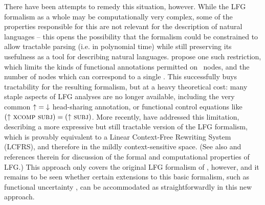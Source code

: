 \documentclass[output=paper,hidelinks]{langscibook}
\begin{document}
There have been attempts to remedy this situation, however. While the LFG
formalism as a whole may be computationally very complex, some of the properties
responsible for this are not relevant for the description of natural languages
-- this opens the possibility that the formalism could be constrained to allow
tractable parsing (i.e. in polynomial time) while still preserving its
usefulness as a tool for describing natural languages. \citet{SekiEtAl1993}
propose one such restriction, which limits the kinds of functional annotations
permitted on \cstruc\ nodes, and the number of nodes which can correspond to a
single \fstruc. This successfully buys tractability for the resulting formalism,
but at a heavy theoretical cost: many staple aspects of LFG analyses are no
longer available, including the very common \mbox{$\mbox{$\uparrow$}{} = \mbox{$\downarrow$}{}$} head-sharing
annotation, or functional control equations like
\mbox{$(\UP\ \XCOMP\ \SUBJ) = (\UP\ \SUBJ)$}. More recently, \citet{wed:kap:20}
have addressed this limitation, describing a more expressive but still tractable
version of the LFG formalism, which is provably equivalent to a Linear
Context-Free Rewriting System (LCFRS), and therefore in the mildly
context-sensitive space. (See also  and
references therein for discussion of the formal and computational properties of
LFG.) This approach only covers the original LFG formalism of
\citet{kaplanbresnan82}, however, and it remains to be seen whether certain
extensions to this basic formalism, such as functional uncertainty
\citep{kaplan-etal1987,kaplzaen89}, can be accommodated as straightforwardly in
this new approach.
\end{document}

